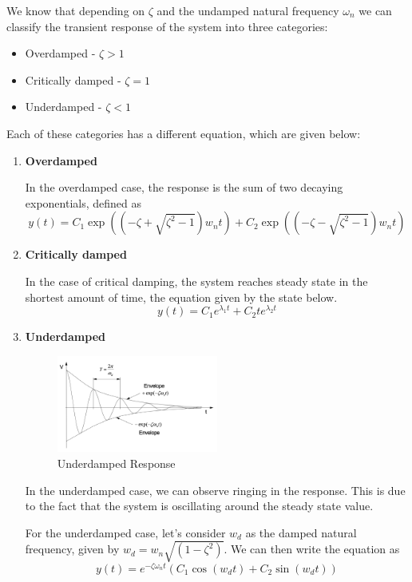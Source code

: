 We know that depending on $\zeta$ and the undamped natural frequency $\omega_n$ we can classify the transient response of the system into three categories:
\begin{itemize}
    \item Overdamped - $\zeta > 1$
    \item Critically damped - $\zeta = 1$
    \item Underdamped - $\zeta < 1$
\end{itemize}

Each of these categories has a different equation, which are given below:


\begin{enumerate}
    \item {\bf Overdamped}

          In the overdamped case, the response is the sum of two decaying exponentials, defined as
          \begin{equation}
              y(t) = C_1 \exp{
                  \left(\left(-\zeta + \sqrt{\zeta^2 - 1}\right) w_nt\right)
              } + C_2 \exp{
                  \left(\left(-\zeta - \sqrt{\zeta^2 - 1}\right) w_nt\right)
              }
          \end{equation}
    \item {\bf Critically damped}

          In the case of critical damping, the system reaches steady state in the shortest amount of time, the equation given by the state below.
          \begin{equation}
              y(t) = C_1 e^{\lambda_1 t} + C_2 t e^{\lambda_2 t}
          \end{equation}
          \newpage
    \item {\bf Underdamped}
          \begin{figure}[H]
              \centering
              \includegraphics[width=0.5\textwidth]{images/underdamped_intro_behaviour.png}
              \caption{Underdamped Response}
              \label{fig:underdamped_envelope}
          \end{figure}

          In the underdamped case, we can observe ringing in the response. This is due to the fact that the system is oscillating around the steady state value.

          For the underdamped case, let's consider $w_d$ as the damped natural frequency, given by $w_d = w_n \sqrt{(1-\zeta^2)}$. We can then write the equation as
          \begin{equation}
              y(t) = e^{-\zeta \omega_n t} \left(C_1\cos\left(w_dt\right) + C_2\sin\left(w_dt\right) \right)
          \end{equation}
\end{enumerate}
